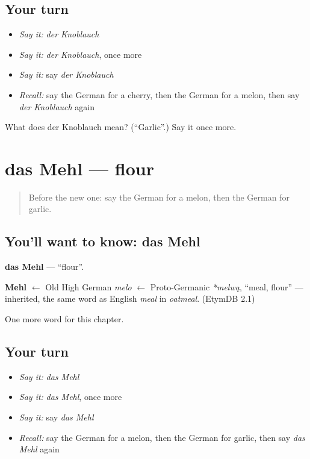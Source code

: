 \subsection*{Your turn}
\begin{itemize}
\raggedright
  \item \emph{Say it:} \emph{der Knoblauch}
  \item \emph{Say it:} \emph{der Knoblauch}, once more
  \item \emph{Say it:} say \emph{der Knoblauch}
  \item \emph{Recall:} say the German for a cherry, then the German for a melon, then say \emph{der Knoblauch} again
\end{itemize}

\begin{tcolorbox}[breakable,colback=teal!4,colframe=teal!35!black,title={Before you move on}]
What does der Knoblauch mean? (\textquotedblleft{}Garlic\textquotedblright{}.) Say it once more.
\end{tcolorbox}
\section[das Mehl]{das Mehl — flour}

\label{lesson:GE-C122-mehl}



\begin{quote}
Before the new one: say the German for a melon, then the German for garlic.
\end{quote}

\subsection*{You'll want to know: das Mehl}
\textbf{das Mehl} — \textquotedblleft{}flour\textquotedblright{}.

\begin{cousinweb}
\textbf{Mehl} $\leftarrow$ Old High German \emph{melo} $\leftarrow$ Proto-Germanic \emph{*melwą}, \textquotedblleft{}meal, flour\textquotedblright{} — inherited, the same word as English \emph{meal} in \emph{oatmeal}. (EtymDB 2.1)
\end{cousinweb}

\begin{grammarlens}[title={What you've built}]
One more word for this chapter.
\end{grammarlens}

\subsection*{Your turn}
\begin{itemize}
\raggedright
  \item \emph{Say it:} \emph{das Mehl}
  \item \emph{Say it:} \emph{das Mehl}, once more
  \item \emph{Say it:} say \emph{das Mehl}
  \item \emph{Recall:} say the German for a melon, then the German for garlic, then say \emph{das Mehl} again
\end{itemize}

